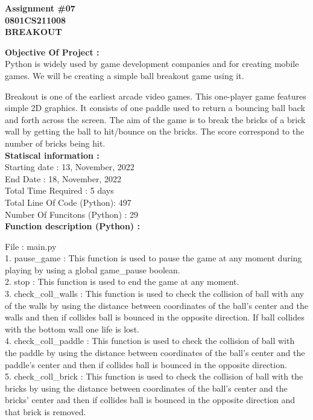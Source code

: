 \documentclass{article}
\begin{document}
\pagestyle{fancy}

\begin{center}{\centering \large{\textbf{\bf Assignment \#07\\0801CS211008\\BREAKOUT\\}}}\end{center}

\textbf{\bf Objective Of Project : \\}
Python is widely used by game development companies and for creating mobile games. We will be creating a simple ball breakout game using it.
\par Breakout is one of the earliest arcade video games. This one-player game features simple 2D graphics. It consists of one paddle used to return a bouncing ball back and forth across the screen. The aim of the game is to break the bricks of a brick wall by getting the ball to hit/bounce on the bricks. The score correspond to the number of bricks being hit. \\

\textbf{\bf Statiscal information : \\}
Starting date : 13, November, 2022\\
End Date : 18, November, 2022\\
Total Time Required : 5 days\\
Total Line Of Code (Python):  497\\
Number Of Funcitons (Python) : 29\\

\textbf{\bf Function description (Python) : \\}

File : main.py\\
1. pause\_game : This function is used to pause the game at any moment during playing by using a global game\_pause boolean.\\
2. stop : This function is used to end the game at any moment.\\
3. check\_coll\_walls : This function is used to check the collision of ball with any of the walls by using the distance between coordinates of the ball's center and the walls and then if collides ball is bounced in the opposite direction. If ball collides with the bottom wall one life is lost.\\
4. check\_coll\_paddle : This function is used to check the collision of ball with the paddle by using the distance between coordinates of the ball's center and the paddle's center and then if collides ball is bounced in the opposite direction.\\
5. check\_coll\_brick : This function is used to check the collision of ball with the bricks by using the distance between coordinates of the ball's center and the bricks' center and then if collides ball is bounced in the opposite direction and that brick is removed.\\
\end{document}
